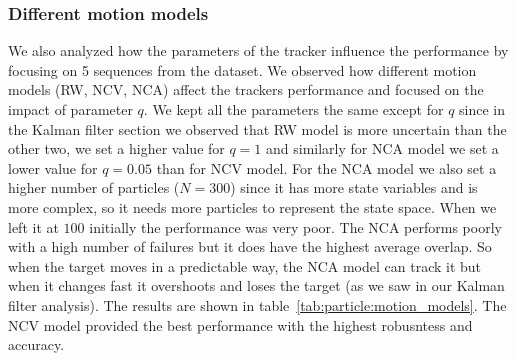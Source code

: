\documentclass[9pt]{IEEEtran}
\begin{document}
\begin{table}
  \centering
  \caption{Tracker performance with different $N$.}\label{tab:particle:N_diff}
\end{table}

\subsubsection{Different motion models}
We also analyzed how the parameters of the tracker influence the performance by focusing on 5 sequences from 
the dataset. We observed how different motion models (RW, NCV, NCA) affect the trackers performance and focused
on the impact of parameter $q$. We kept all the parameters the same except for $q$ since in the Kalman filter section
we observed that RW model is more uncertain than the other two, we set a higher value for $q = 1$ and similarly for NCA model
we set a lower value for $q = 0.05$  than for NCV model. For the NCA model we also set a higher number of particles ($N = 300$)
since it has more state variables and is more complex, so it needs more particles to represent the state space. When we
left it at $100$ initially the performance was very poor. The NCA performs poorly with a high number of failures but
it does have the highest average overlap. So when the target moves in a predictable way, the NCA model can track it
but when it changes fast it overshoots and loses the target (as we saw in our Kalman filter analysis).
The results are shown in table~\ref{tab:particle:motion_models}.
The NCV model provided the best performance with the highest robusntess and accuracy. 


\begin{table}
  \centering
  \caption{Tracker performance with different motion models.}\label{tab:particle:motion_models}
\end{table}
\end{document}

